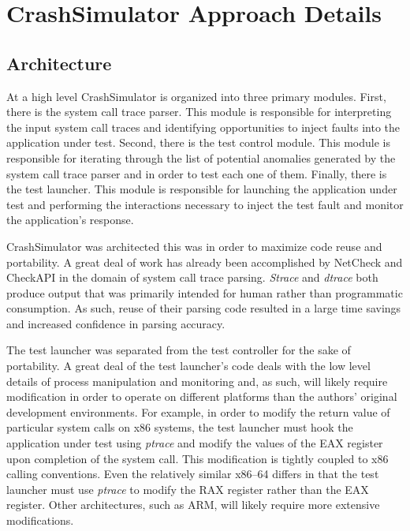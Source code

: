 \section{CrashSimulator Approach Details}

    \subsection{Architecture}

        At a high level CrashSimulator is organized into three primary modules. First, there is the system call trace
        parser. This module is responsible for interpreting the input system call traces and identifying opportunities
        to inject faults into the application under test. Second, there is the test control module. This module is
        responsible for iterating through the list of potential anomalies generated by the system call trace parser and
        in order to test each one of them. Finally, there is the test launcher. This module is responsible for launching
        the application under test and performing the interactions necessary to inject the test fault and monitor the
        application's response.

        CrashSimulator was architected this was in order to maximize code reuse and portability. A great deal of work
        has already been accomplished by NetCheck and CheckAPI in the domain of system call trace parsing. \emph{Strace}
        and \emph{dtrace} both produce output that was primarily intended for human rather than programmatic
        consumption. As such, reuse of their parsing code resulted in a large time savings and increased confidence in
        parsing accuracy.

        The test launcher was separated from the test controller for the sake of portability. A great deal of the test
        launcher's code deals with the low level details of process manipulation and monitoring and, as such, will
        likely require modification in order to operate on different platforms than the authors' original development
        environments. For example, in order to modify the return value of particular system calls on x86 systems, the
        test launcher must hook the application under test using \emph{ptrace} and modify the values of the EAX register
        upon completion of the system call. This modification is tightly coupled to x86 calling conventions. Even the
        relatively similar x86--64 differs in that the test launcher must use \emph{ptrace} to modify the RAX register
        rather than the EAX register. Other architectures, such as ARM, will likely require more extensive
        modifications.

